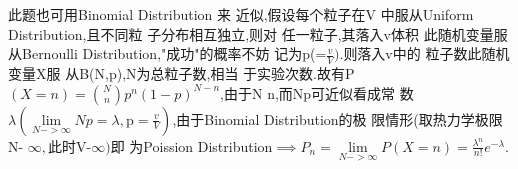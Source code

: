\documentclass{ctexart}
\begin{document}
此题也可用Binomial Distribution 来%
近似,假设每个粒子在V%
中服从Uniform Distribution,且不同粒%
子分布相互独立,则对%
任一粒子,其落入v体积%
此随机变量服从Bernoulli
Distribution,"成功"的概率不妨%
记为p(=$\frac{v}{V}).$则落入v中的%
粒子数此随机变量X服%
从B(N,p),N为总粒子数,相当%
于实验次数.故有P$\left( X=n\right)
=\binom{N}{n}p^{n}\left( 1-p\right) ^{N-n}$,由于N\TEXTsymbol{>}%
\TEXTsymbol{>}n,而Np可近似看成常%
数$\lambda \left( \underset{N->\infty }{\lim }Np=\lambda ,\text{p}=%
\frac{v}{V}\right) $,由于Binomial Distribution的极%
限情形(取热力学极限N-%
\TEXTsymbol{>}$\infty ,$此时V-\TEXTsymbol{>}$\infty )$即%
为Poission Distribution$\implies P_{n}=\underset{N->\infty }{\lim }%
P\left( X=n\right) =\frac{\lambda ^{n}}{n!}e^{-\lambda }.$
\end{document}
